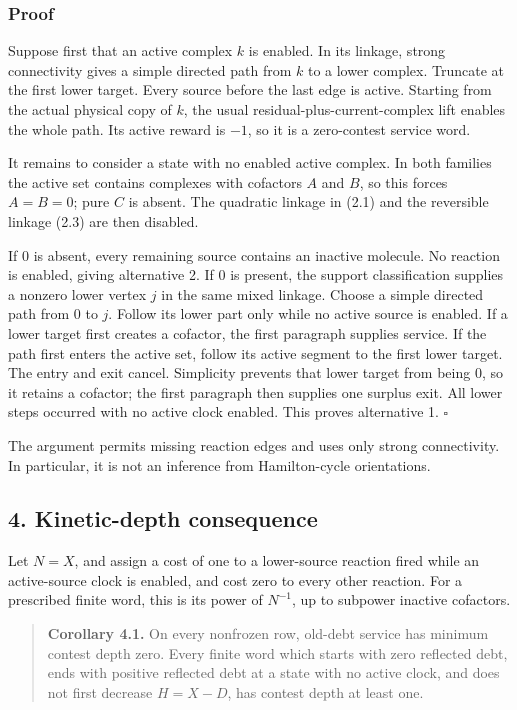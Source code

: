\subsubsection{Proof}

Suppose first that an active complex \(k\) is enabled. In its linkage,
strong connectivity gives a simple directed path from \(k\) to a lower
complex. Truncate at the first lower target. Every source before the
last edge is active. Starting from the actual physical copy of \(k\),
the usual residual-plus-current-complex lift enables the whole path. Its
active reward is \(-1\), so it is a zero-contest service word.

It remains to consider a state with no enabled active complex. In both
families the active set contains complexes with cofactors \(A\) and
\(B\), so this forces \(A=B=0\); pure \(C\) is absent. The quadratic
linkage in (2.1) and the reversible linkage (2.3) are then disabled.

If \(0\) is absent, every remaining source contains an inactive
molecule. No reaction is enabled, giving alternative 2. If \(0\) is
present, the support classification supplies a nonzero lower vertex
\(j\) in the same mixed linkage. Choose a simple directed path from
\(0\) to \(j\). Follow its lower part only while no active source is
enabled. If a lower target first creates a cofactor, the first paragraph
supplies service. If the path first enters the active set, follow its
active segment to the first lower target. The entry and exit cancel.
Simplicity prevents that lower target from being \(0\), so it retains a
cofactor; the first paragraph then supplies one surplus exit. All lower
steps occurred with no active clock enabled. This proves alternative 1.
\(\square\)

The argument permits missing reaction edges and uses only strong
connectivity. In particular, it is not an inference from Hamilton-cycle
orientations.

\subsection{4. Kinetic-depth
consequence}

Let \(N=X\), and assign a cost of one to a lower-source reaction fired
while an active-source clock is enabled, and cost zero to every other
reaction. For a prescribed finite word, this is its power of \(N^{-1}\),
up to subpower inactive cofactors.

\begin{quote}
\textbf{Corollary 4.1.} On every nonfrozen row, old-debt service has
minimum contest depth zero. Every finite word which starts with zero
reflected debt, ends with positive reflected debt at a state with no
active clock, and does not first decrease \(H=X-D\), has contest depth
at least one.
\end{quote}

